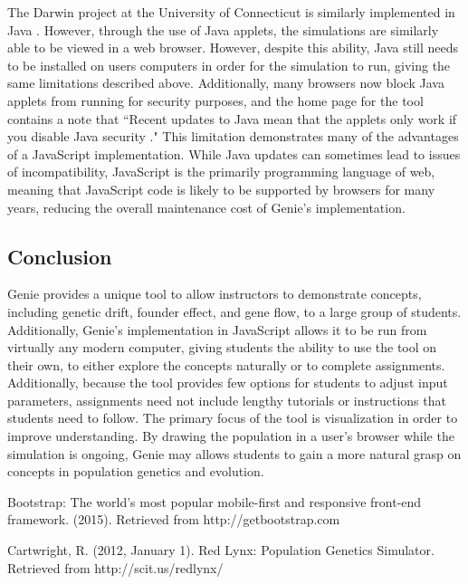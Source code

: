 \documentclass[12pt]{article}
\begin{document}
\begin{spacing}{1.6}
\newline
The Darwin project at the University of Connecticut is similarly implemented in Java \cite{uconn}. However, through the use of Java applets, the simulations are similarly able to be viewed in a web browser. However, despite this ability, Java still needs to be installed on users computers in order for the simulation to run, giving the same limitations described above. Additionally, many browsers now block Java applets from running for security purposes, and the home page for the tool contains a note that ``Recent updates to Java mean that the applets only work if you disable Java security \cite{uconn}." This limitation demonstrates many of the advantages of a JavaScript implementation. While Java updates can sometimes lead to issues of incompatibility, JavaScript is the primarily programming language of web, meaning that JavaScript code is likely to be supported by browsers for many years, reducing the overall maintenance cost of Genie's implementation.

\subsection{Conclusion}
Genie provides a unique tool to allow instructors to demonstrate concepts, including genetic drift, founder effect, and gene flow, to a large group of students. Additionally, Genie's implementation in JavaScript allows it to be run from virtually any modern computer, giving students the ability to use the tool on their own, to either explore the concepts naturally or to complete assignments. Additionally, because the tool provides few options for students to adjust input parameters, assignments need not include lengthy tutorials or instructions that students need to follow. The primary focus of the tool is visualization in order to improve understanding. By drawing the population in a user's browser while the simulation is ongoing, Genie may allows students to gain a more natural grasp on concepts in population genetics and evolution.

\newpage

\begin{thebibliography}{9}

Bootstrap: The world's most popular mobile-first and responsive front-end framework. (2015). Retrieved from http://getbootstrap.com

Cartwright, R. (2012, January 1). Red Lynx: Population Genetics Simulator. Retrieved from http://scit.us/redlynx/


\end{thebibliography}
\end{spacing}
\end{document}
